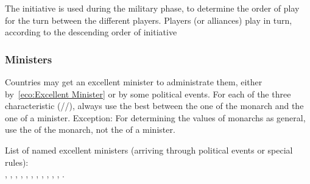 \aparag The initiative is used during the military phase, to determine the
order of play for the turn between the different players.
\bparag Players (or alliances) play in turn, according to the descending order
of initiative


\subsubsection{Ministers}
\aparag Countries may get an excellent minister to administrate them, either
by~\ref{eco:Excellent Minister} or by some political events.
\bparag For each of the three characteristic (\ADM/\DIP/\MIL), always use the
best between the one of the monarch and the one of a minister.
\bparag Exception: For determining the values of monarchs as general, use the
\MIL of the monarch, not the \MIL of a minister.

\aparag List of named excellent ministers (arriving through political events
or special rules):\\
\ministreColbert, \ministreHeinsius, \ministreKaunitz, \ministreKoprulu,
\ministreMazarin, \ministreOlivares, \ministreOxenstierna, \ministrePatkul,
\ministrePitt, \ministrePotemkine, \ministreRichelieu, .








